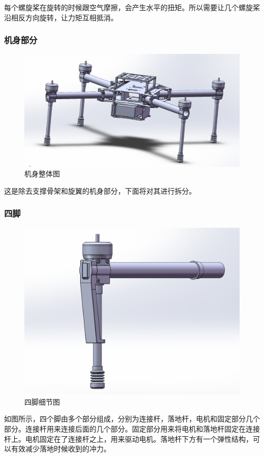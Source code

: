 \documentclass{ctexart}
\begin{document}
每个螺旋桨在旋转的时候跟空气摩擦，会产生水平的扭矩。所以需要让几个螺旋桨沿相反方向旋转，让力矩互相抵消。\par
\subsubsection{机身部分}
\begin{figure}[H]
\centering
    \includegraphics[width = \textwidth]{011}
    \caption{机身整体图}\par
\end{figure}
这是除去支撑骨架和旋翼的机身部分，下面将对其进行拆分。
\subsubsection{四脚}
\begin{figure}[H]
\centering
    \includegraphics[width = \textwidth]{012}
    \caption{四脚细节图}\par
\end{figure}
如图所示，四个脚由多个部分组成，分别为连接杆，落地杆，电机和固定部分几个部分。连接杆用来连接后面的几个部分。固定部分用来将电机和落地杆固定在连接杆上。电机固定在了连接杆之上，用来驱动电机。落地杆下方有一个弹性结构，可以有效减少落地时候收到的冲力。
\end{document}
